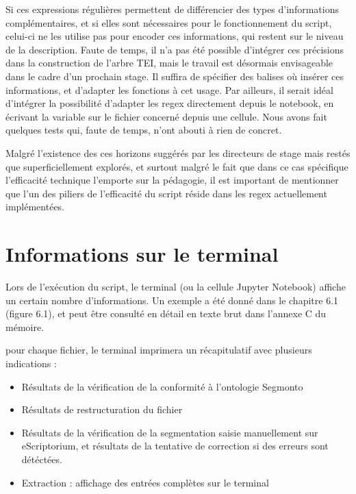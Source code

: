\documentclass[a4paper,12pt,twoside]{book}
\begin{document}
Si ces expressions régulières permettent de différencier des types d'informations complémentaires, et si elles sont nécessaires pour le fonctionnement du script, celui-ci ne les utilise pas pour encoder ces informations, qui restent sur le niveau de la description. Faute de temps, il n'a pas été possible d'intégrer ces précisions dans la construction de l'arbre TEI, mais le travail est désormais envisageable dans le cadre d'un prochain stage. Il suffira de spécifier des balises où insérer ces informations, et d'adapter les fonctions à cet usage. Par ailleurs, il serait idéal d'intégrer la possibilité d'adapter les regex directement depuis le notebook, en écrivant la variable sur le fichier concerné depuis une cellule. Nous avons fait quelques tests qui, faute de temps, n'ont abouti à rien de concret. 

Malgré l'existence des ces horizons suggérés par les directeurs de stage mais restés que superficiellement explorés, et surtout malgré le fait que dans ce cas spécifique l'efficacité technique l'emporte sur la pédagogie, il est important de mentionner que l'un des piliers de l'efficacité du script réside dans les regex actuellement implémentées.


\section{Informations sur le terminal}

Lors de l'exécution du script, le terminal (ou la cellule Jupyter Notebook) affiche un certain nombre d'informations. Un exemple a été donné dans le chapitre  6.1 (figure 6.1), et peut être consulté en détail en texte brut dans l'annexe C du mémoire.

pour chaque fichier, le terminal imprimera un récapitulatif avec plusieurs indications :

\begin{itemize}
	\item Résultats de la vérification de la conformité à l'ontologie Segmonto
	\item Résultats de restructuration du fichier
	\item Résultats de la vérification de la segmentation saisie manuellement sur eScriptorium, et résultats de la tentative de correction si des erreurs sont détéctées.
	\item Extraction : affichage des entrées complètes sur le terminal	 
\end{itemize}
\end{document}
